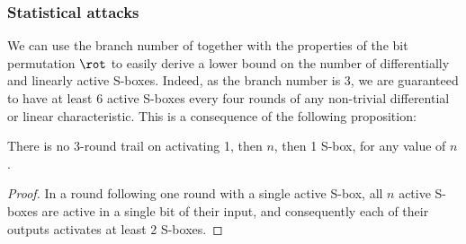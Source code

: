 \subsubsection{Statistical attacks}
\label{sec:stats}
We can use the branch number of \littlunOne together with the properties of the bit permutation $\rot$ to easily derive a lower bound on the number of
differentially and linearly active S-boxes. Indeed, as the branch number is 3, we are guaranteed to have at least 6 active S-boxes
every four rounds of any non-trivial differential or linear characteristic. This is a consequence of the following proposition:
\begin{prop}
\label{proppropag}
There is no 3-round trail on \fly activating 1, then $n$, then 1 S-box, for any value of $n$.
\end{prop}
\begin{proof}
In a round following one round with a single active S-box, all $n$ active S-boxes are active in a single bit of their input, and consequently
each of their outputs activates at least 2 S-boxes.
\end{proof}


